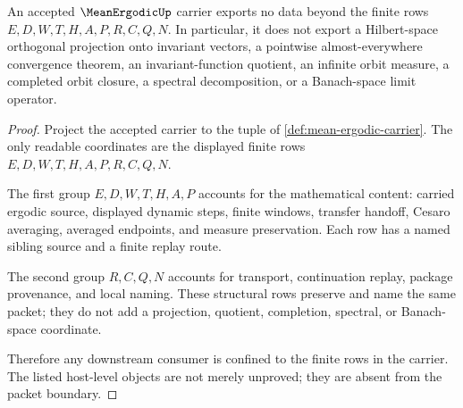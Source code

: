 \begin{theorem}
\label{thm:mean-ergodic-nonescape-boundary}
An accepted $\MeanErgodicUp$ carrier exports no data beyond the finite rows $E,D,W,T,H,A,P,R,C,Q,N$. In particular, it does not export a Hilbert-space orthogonal projection onto invariant vectors, a pointwise almost-everywhere convergence theorem, an invariant-function quotient, an infinite orbit measure, a completed orbit closure, a spectral decomposition, or a Banach-space limit operator.
\end{theorem}
\begin{proof}
Project the accepted carrier to the tuple of \autoref{def:mean-ergodic-carrier}. The only readable coordinates are the displayed finite rows $E,D,W,T,H,A,P,R,C,Q,N$.

The first group $E,D,W,T,H,A,P$ accounts for the mathematical content: carried ergodic source, displayed dynamic steps, finite windows, transfer handoff, Cesaro averaging, averaged endpoints, and measure preservation. Each row has a named sibling source and a finite replay route.

The second group $R,C,Q,N$ accounts for transport, continuation replay, package provenance, and local naming. These structural rows preserve and name the same packet; they do not add a projection, quotient, completion, spectral, or Banach-space coordinate.

Therefore any downstream consumer is confined to the finite rows in the carrier. The listed host-level objects are not merely unproved; they are absent from the packet boundary.
\end{proof}



